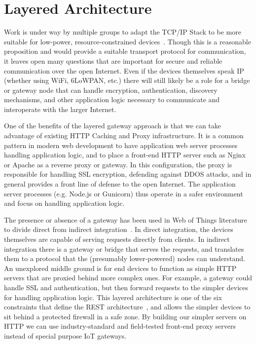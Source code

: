 \documentclass{acm_proc_article-sp}
\begin{document}
\section{Layered Architecture}

Work is under way by multiple groups to adapt the TCP/IP Stack to be more
suitable for low-power, resource-constrained devices~\cite{iotsurvey}. Though
this is a reasonable proposition and would provide a suitable transport
protocol for communication, it leaves open many questions that are important
for secure and reliable communication over the open Internet. Even if the
devices themselves speak IP (whether using WiFi, 6LoWPAN, etc.) there will
still likely be a role for a bridge or gateway node that can handle encryption,
authentication, discovery mechanisms, and other application logic necessary to
communicate and interoperate with the larger Internet.

One of the benefits of the layered gateway approach is that we can take
advantage of existing HTTP Caching and Proxy infrastructure. It is a common
pattern in modern web development to have application web server processes
handling application logic, and to place a front-end HTTP server such as Nginx
or Apache as a reverse proxy or gateway.  In this configuration, the proxy is
responsible for handling SSL encryption, defending against DDOS attacks, and in
general provides a front line of defense to the open Internet. The application
server processes (e.g.  Node.js or Gunicorn) thus operate in a safer
environment and focus on handling application logic.

The presence or absence of a gateway has been used in Web of Things literature
to divide direct from indirect integration~\cite{wotsurvey}. In direct
integration, the devices themselves are capable of serving requests directly
from clients. In indirect integration there is a gateway or bridge that serves
the requests, and translates them to a protocol that the (presumably
lower-powered) nodes can understand. An unexplored middle ground is for end
devices to function as simple HTTP servers that are proxied behind more complex
ones. For example, a gateway could handle SSL and authentication, but then
forward requests to the simpler devices for handling application logic. This
layered architecture is one of the six constraints that define the REST
architecture~\cite{fielding}, and allows the simpler devices to sit behind a
protected firewall in a safe zone. By building our simpler servers on HTTP we
can use industry-standard and field-tested front-end proxy servers instead of
special purpose IoT gateways.
\end{document}
